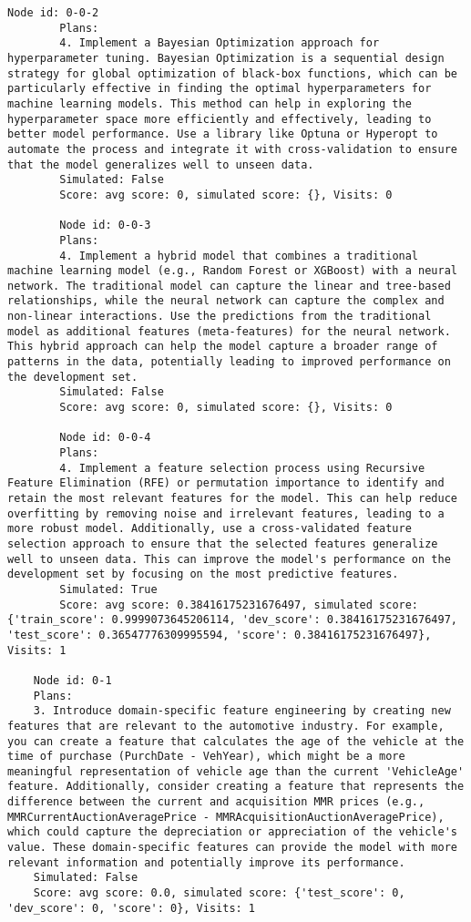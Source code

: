 \begin{lstlisting}[style=txtfile]
		Node id: 0-0-2
		Plans: 
		4. Implement a Bayesian Optimization approach for hyperparameter tuning. Bayesian Optimization is a sequential design strategy for global optimization of black-box functions, which can be particularly effective in finding the optimal hyperparameters for machine learning models. This method can help in exploring the hyperparameter space more efficiently and effectively, leading to better model performance. Use a library like Optuna or Hyperopt to automate the process and integrate it with cross-validation to ensure that the model generalizes well to unseen data.
		Simulated: False
		Score: avg score: 0, simulated score: {}, Visits: 0

		Node id: 0-0-3
		Plans: 
		4. Implement a hybrid model that combines a traditional machine learning model (e.g., Random Forest or XGBoost) with a neural network. The traditional model can capture the linear and tree-based relationships, while the neural network can capture the complex and non-linear interactions. Use the predictions from the traditional model as additional features (meta-features) for the neural network. This hybrid approach can help the model capture a broader range of patterns in the data, potentially leading to improved performance on the development set.
		Simulated: False
		Score: avg score: 0, simulated score: {}, Visits: 0

		Node id: 0-0-4
		Plans: 
		4. Implement a feature selection process using Recursive Feature Elimination (RFE) or permutation importance to identify and retain the most relevant features for the model. This can help reduce overfitting by removing noise and irrelevant features, leading to a more robust model. Additionally, use a cross-validated feature selection approach to ensure that the selected features generalize well to unseen data. This can improve the model's performance on the development set by focusing on the most predictive features.
		Simulated: True
		Score: avg score: 0.38416175231676497, simulated score: {'train_score': 0.9999073645206114, 'dev_score': 0.38416175231676497, 'test_score': 0.36547776309995594, 'score': 0.38416175231676497}, Visits: 1

	Node id: 0-1
	Plans: 
	3. Introduce domain-specific feature engineering by creating new features that are relevant to the automotive industry. For example, you can create a feature that calculates the age of the vehicle at the time of purchase (PurchDate - VehYear), which might be a more meaningful representation of vehicle age than the current 'VehicleAge' feature. Additionally, consider creating a feature that represents the difference between the current and acquisition MMR prices (e.g., MMRCurrentAuctionAveragePrice - MMRAcquisitionAuctionAveragePrice), which could capture the depreciation or appreciation of the vehicle's value. These domain-specific features can provide the model with more relevant information and potentially improve its performance.
	Simulated: False
	Score: avg score: 0.0, simulated score: {'test_score': 0, 'dev_score': 0, 'score': 0}, Visits: 1


\end{lstlisting}
